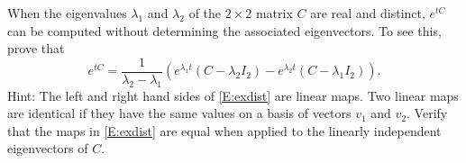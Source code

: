 \documentclass{ximera}
\begin{document}
\begin{computerExercise} \label{c6.3.14}
When the eigenvalues $\lambda_1$ and $\lambda_2$ of the $2\times 2$ 
matrix $C$ are real and distinct, $e^{tC}$ can be computed without determining 
the associated eigenvectors.  To see this, prove that
\begin{equation}  \label{E:exdist}
e^{tC} = \frac{1}{\lambda_2-\lambda_1}\left(e^{\lambda_1 t}(C-\lambda_2I_2) -
e^{\lambda_2 t}(C-\lambda_1I_2)\right).
\end{equation}
Hint:  The left and right hand sides of \eqref{E:exdist} are linear maps.  Two 
linear maps are identical if they have the same values on a basis of vectors 
$v_1$ and $v_2$.  Verify that the maps in \eqref{E:exdist} are equal when 
applied to the linearly independent eigenvectors of $C$.
\end{computerExercise}
\end{document}
